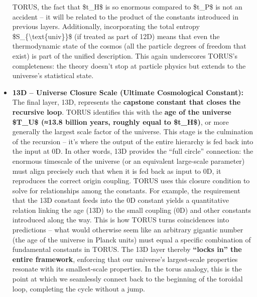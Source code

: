 \documentclass[
]{article}
\begin{document}
\begin{itemize}
  TORUS, the fact that \$t\_H\$ is so enormous compared to \$t\_P\$ is
  not an accident -- it will be related to the product of the constants
  introduced in previous layers. Additionally, incorporating the total
  entropy \$S\_\{\textbackslash text\{univ\}\}\$ (if treated as part of
  12D) means that even the thermodynamic state of the cosmos (all the
  particle degrees of freedom that exist) is part of the unified
  description. This again underscores TORUS's completeness: the theory
  doesn't stop at particle physics but extends to the universe's
  statistical state.
\item
  \textbf{13D -- Universe Closure Scale (Ultimate Cosmological
  Constant):} The final layer, 13D, represents the \textbf{capstone
  constant that closes the recursive loop}. TORUS identifies this with
  the \textbf{age of the universe \$T\_U\$ (≈13.8 billion years, roughly
  equal to \$t\_H\$)}\hspace{0pt}, or more generally the largest scale
  factor of the universe. This stage is the culmination of the recursion
  -- it's where the output of the entire hierarchy is fed back into the
  input at 0D. In other words, 13D provides the ``full circle''
  connection: the enormous timescale of the universe (or an equivalent
  large-scale parameter) must align precisely such that when it is fed
  back as input to 0D, it reproduces the correct origin coupling. TORUS
  uses this closure condition to solve for relationships among the
  constants. For example, the requirement that the 13D constant feeds
  into the 0D constant yields a quantitative relation linking the age
  (13D) to the small coupling (0D) and other constants introduced along
  the way\hspace{0pt}. This is how TORUS turns coincidences into
  predictions -- what would otherwise seem like an arbitrary gigantic
  number (the age of the universe in Planck units) must equal a specific
  combination of fundamental constants in TORUS. The 13D layer thereby
  \textbf{``locks in'' the entire framework}, enforcing that our
  universe's largest-scale properties resonate with its smallest-scale
  properties. In the torus analogy, this is the point at which we
  seamlessly connect back to the beginning of the toroidal loop,
  completing the cycle without a jump.
\end{itemize}
\end{document}
